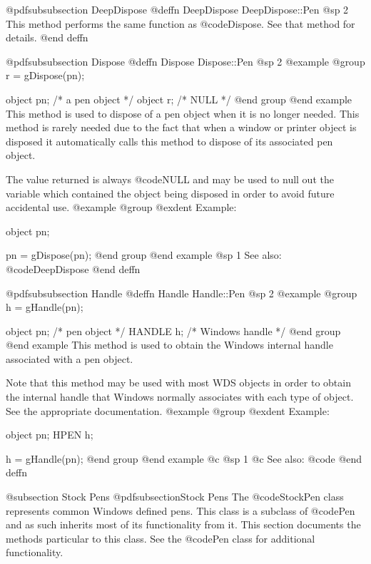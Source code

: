@pdfsubsubsection {DeepDispose}
@deffn {DeepDispose} DeepDispose::Pen
@sp 2
This method performs the same function as @code{Dispose}.  See that
method for details.
@end deffn







@pdfsubsubsection {Dispose}
@deffn {Dispose} Dispose::Pen
@sp 2
@example
@group
r = gDispose(pn);

object  pn;   /*  a pen object  */
object  r;    /*  NULL          */
@end group
@end example
This method is used to dispose of a pen object when it is no longer
needed.  This method is rarely needed due to the fact that when a window
or printer object is disposed it automatically calls this method to
dispose of its associated pen object.

The value returned is always @code{NULL} and may be used to null out
the variable which contained the object being disposed in order to
avoid future accidental use.
@example
@group
@exdent Example:

object  pn;

pn = gDispose(pn);
@end group
@end example
@sp 1
See also:  @code{DeepDispose}
@end deffn






@pdfsubsubsection {Handle}
@deffn {Handle} Handle::Pen
@sp 2
@example
@group
h = gHandle(pn);

object  pn;     /*  pen object    */
HANDLE  h;      /*  Windows handle  */
@end group
@end example
This method is used to obtain the Windows internal handle associated with
a pen object.  

Note that this method may be used with most WDS objects in order to obtain
the internal handle that Windows normally associates with each type of object.
See the appropriate documentation.
@example
@group
@exdent Example:

object  pn;
HPEN    h;

h = gHandle(pn);
@end group
@end example
@c @sp 1
@c See also:  @code{}
@end deffn









@subsection Stock Pens
@pdfsubsection{Stock Pens}
The @code{StockPen} class represents common Windows defined pens.  This
class is a subclass of @code{Pen} and as such inherits most of its
functionality from it.  This section documents the methods particular to
this class.  See the @code{Pen} class for additional functionality.






